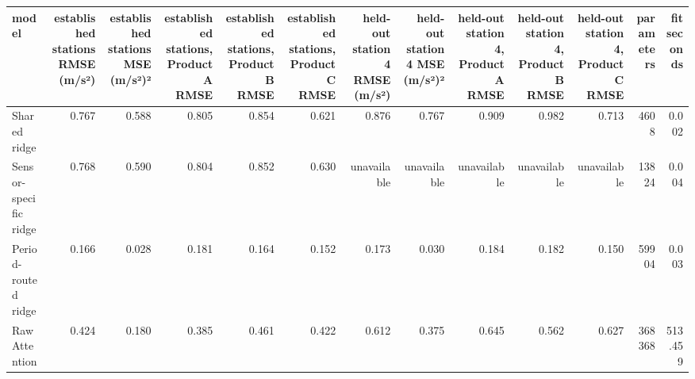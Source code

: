 \begin{tabular}{lrrrrrrrrrrrr}
\toprule
model & established stations RMSE (m/s²) & established stations MSE (m/s²)² & established stations, Product A RMSE & established stations, Product B RMSE & established stations, Product C RMSE & held-out station 4 RMSE (m/s²) & held-out station 4 MSE (m/s²)² & held-out station 4, Product A RMSE & held-out station 4, Product B RMSE & held-out station 4, Product C RMSE & parameters & fit seconds \\
\midrule
Shared ridge & 0.767 & 0.588 & 0.805 & 0.854 & 0.621 & 0.876 & 0.767 & 0.909 & 0.982 & 0.713 & 4608 & 0.002 \\
Sensor-specific ridge & 0.768 & 0.590 & 0.804 & 0.852 & 0.630 & unavailable & unavailable & unavailable & unavailable & unavailable & 13824 & 0.004 \\
Period-routed ridge & 0.166 & 0.028 & 0.181 & 0.164 & 0.152 & 0.173 & 0.030 & 0.184 & 0.182 & 0.150 & 59904 & 0.003 \\
Raw Attention & 0.424 & 0.180 & 0.385 & 0.461 & 0.422 & 0.612 & 0.375 & 0.645 & 0.562 & 0.627 & 368368 & 513.459 \\
\bottomrule
\end{tabular}
